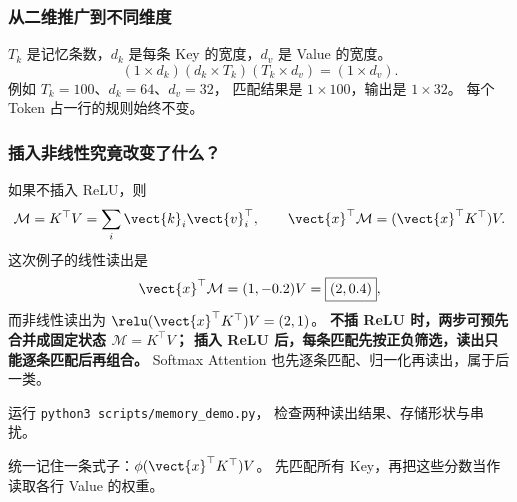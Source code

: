 \subsubsection{从二维推广到不同维度}
$T_k$ 是记忆条数，$d_k$ 是每条 Key 的宽度，$d_v$ 是 Value 的宽度。
\[
(1\times d_k)(d_k\times T_k)(T_k\times d_v)=(1\times d_v).
\]
例如 $T_k=100$、$d_k=64$、$d_v=32$，
匹配结果是 $1\times100$，输出是 $1\times32$。
每个 Token 占一行的规则始终不变。

\subsubsection{插入非线性究竟改变了什么？}
如果不插入 ReLU，则
\[
\mathcal{M}=K^\top V=\sum_i \vect{k}_i \vect{v}_i^\top,
\qquad \vect{x}^\top\mathcal{M}=(\vect{x}^\top K^\top)V.
\]
这次例子的线性读出是
\[
\vect{x}^\top\mathcal{M}=(1,-0.2)V=\boxed{(2,0.4)},
\]
而非线性读出为 $\relu(\vect{x}^\top K^\top)V=(2,1)$。
\textbf{不插 ReLU 时，两步可预先合并成固定状态 $\mathcal{M}=K^\top V$；
插入 ReLU 后，每条匹配先按正负筛选，读出只能逐条匹配后再组合。}
Softmax Attention 也先逐条匹配、归一化再读出，属于后一类。

运行 \texttt{python3 scripts/memory\_demo.py}，
检查两种读出结果、存储形状与串扰。

\begin{idea}
统一记住一条式子：$\phi(\vect{x}^\top K^\top)V$。
先匹配所有 Key，再把这些分数当作读取各行 Value 的权重。
\end{idea}
